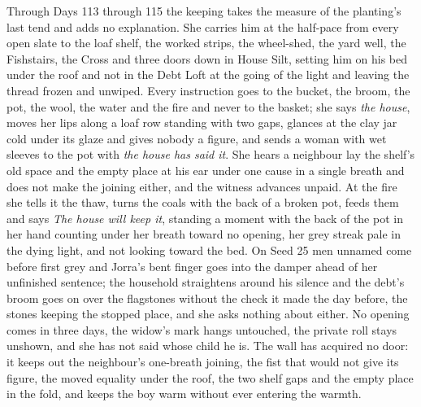 \documentclass{design/chronicle}
\begin{document}
{Through Days 113 through 115 the keeping takes the measure of the planting’s last tend and adds no explanation. She carries him at the half-pace from every open slate to the loaf shelf, the worked strips, the wheel-shed, the yard well, the Fishstairs, the Cross and three doors down in House Silt, setting him on his bed under the roof and not in the Debt Loft at the going of the light and leaving the thread frozen and unwiped. Every instruction goes to the bucket, the broom, the pot, the wool, the water and the fire and never to the basket; she says \emph{the house}, moves her lips along a loaf row standing with two gaps, glances at the clay jar cold under its glaze and gives nobody a figure, and sends a woman with wet sleeves to the pot with \emph{the house has said it}. She hears a neighbour lay the shelf’s old space and the empty place at his ear under one cause in a single breath and does not make the joining either, and the witness advances unpaid. At the fire she tells it the thaw, turns the coals with the back of a broken pot, feeds them and says \emph{The house will keep it}, standing a moment with the back of the pot in her hand counting under her breath toward no opening, her grey streak pale in the dying light, and not looking toward the bed. On Seed 25 men unnamed come before first grey and Jorra’s bent finger goes into the damper ahead of her unfinished sentence; the household straightens around his silence and the debt’s broom goes on over the flagstones without the check it made the day before, the stones keeping the stopped place, and she asks nothing about either. No opening comes in three days, the widow’s mark hangs untouched, the private roll stays unshown, and she has not said whose child he is. The wall has acquired no door: it keeps out the neighbour’s one-breath joining, the fist that would not give its figure, the moved equality under the roof, the two shelf gaps and the empty place in the fold, and keeps the boy warm without ever entering the warmth.

}
\end{document}
